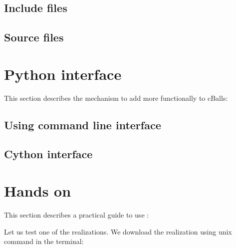 \documentclass[letterpaper,10pt,english]{sphinxmanual}
\begin{document}
\section{Include files}
\label{\detokenize{addons:include-files}}

\section{Source files}
\label{\detokenize{addons:source-files}}
\sphinxstepscope


\chapter{Python interface}
\label{\detokenize{python:python-interface}}\label{\detokenize{python::doc}}
\sphinxAtStartPar
This section describes the mechanism to add more functionally to cBalls:


\section{Using command line interface}
\label{\detokenize{python:using-command-line-interface}}

\section{Cython interface}
\label{\detokenize{python:cython-interface}}
\sphinxstepscope


\chapter{Hands on}
\label{\detokenize{handson:hands-on}}\label{\detokenize{handson::doc}}
\sphinxAtStartPar
This section describes a practical guide to use :

\sphinxAtStartPar
Let us test one of the  realizations. We download the realization using unix  command in the terminal:

\begin{sphinxVerbatim}[commandchars=\\\{\}]
 
\end{sphinxVerbatim}
\end{document}

